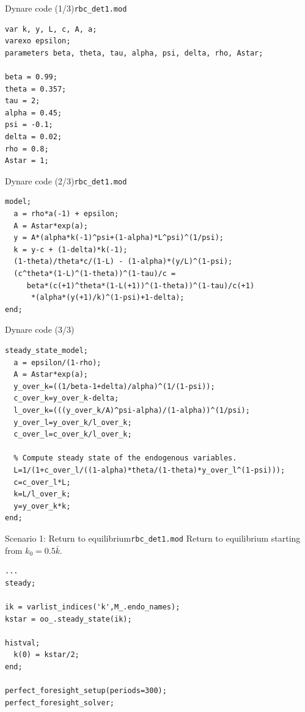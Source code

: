 \documentclass[handout,usepdftitle=false,xcolor=dvipsnames,aspectratio=169]{beamer}
\begin{document}
\begin{frame}[fragile]{Dynare code (1/3)}{\texttt{rbc\_det1.mod}}
  \begin{verbatim}
var k, y, L, c, A, a;
varexo epsilon;
parameters beta, theta, tau, alpha, psi, delta, rho, Astar;

beta = 0.99;
theta = 0.357;
tau = 2;
alpha = 0.45;
psi = -0.1;
delta = 0.02;
rho = 0.8;
Astar = 1;
\end{verbatim}
\end{frame}

\begin{frame}[fragile]{Dynare code (2/3)}{\texttt{rbc\_det1.mod}}
  \begin{verbatim}
model;
  a = rho*a(-1) + epsilon;
  A = Astar*exp(a);
  y = A*(alpha*k(-1)^psi+(1-alpha)*L^psi)^(1/psi);
  k = y-c + (1-delta)*k(-1);
  (1-theta)/theta*c/(1-L) - (1-alpha)*(y/L)^(1-psi);
  (c^theta*(1-L)^(1-theta))^(1-tau)/c =
     beta*(c(+1)^theta*(1-L(+1))^(1-theta))^(1-tau)/c(+1)
      *(alpha*(y(+1)/k)^(1-psi)+1-delta);
end;
\end{verbatim}
\end{frame}

\begin{frame}{Dynare code (3/3)}
  \begin{verbatim}
steady_state_model;
  a = epsilon/(1-rho);
  A = Astar*exp(a);
  y_over_k=((1/beta-1+delta)/alpha)^(1/(1-psi));
  c_over_k=y_over_k-delta;
  l_over_k=(((y_over_k/A)^psi-alpha)/(1-alpha))^(1/psi);
  y_over_l=y_over_k/l_over_k;
  c_over_l=c_over_k/l_over_k;

  % Compute steady state of the endogenous variables.
  L=1/(1+c_over_l/((1-alpha)*theta/(1-theta)*y_over_l^(1-psi)));
  c=c_over_l*L;
  k=L/l_over_k;
  y=y_over_k*k;
end;
\end{verbatim}
\end{frame}



\begin{frame}[fragile]{Scenario 1: Return to equilibrium}{\texttt{rbc\_det1.mod}}
  Return to equilibrium starting from $k_0 = 0.5 \bar k$.

  \begin{verbatim}
...
steady;

ik = varlist_indices('k',M_.endo_names);
kstar = oo_.steady_state(ik);

histval;
  k(0) = kstar/2;
end;

perfect_foresight_setup(periods=300);
perfect_foresight_solver;
\end{verbatim}
\end{frame}
\end{document}
